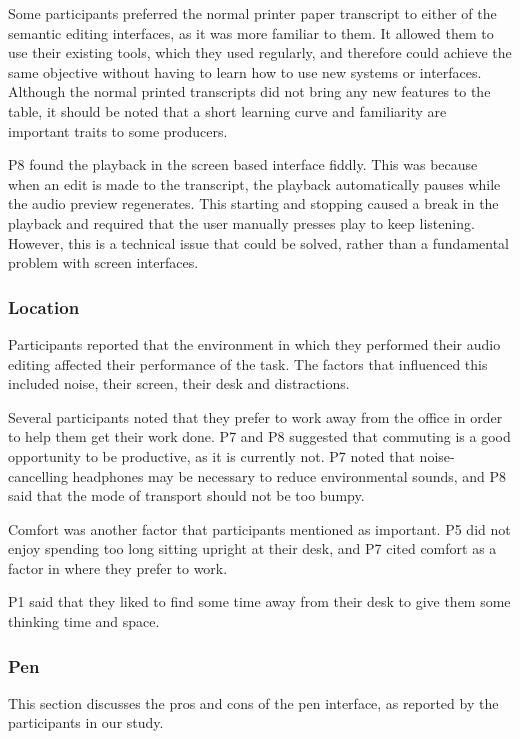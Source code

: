 Some participants preferred the normal printer paper transcript to either of the semantic editing interfaces, as it was
more familiar to them. It allowed them to use their existing tools, which they used regularly, and therefore could
achieve the same objective without having to learn how to use new systems or interfaces. Although the normal printed
transcripts did not bring any new features to the table, it should be noted that a short learning curve and familiarity
are important traits to some producers.

P8 found the playback in the screen based interface fiddly. This was because when an edit is made to the transcript,
the playback automatically pauses while the audio preview regenerates. This starting and stopping caused a break in the
playback and required that the user manually presses play to keep listening. However, this is a technical issue that
could be solved, rather than a fundamental problem with screen interfaces.

\subsubsection{Location}

Participants reported that the environment in which they performed their audio editing affected their performance of
the task. The factors that influenced this included noise, their screen, their desk and distractions.

Several participants noted that they prefer to work away from the office in order to help them get their work done. P7
and P8 suggested that commuting is a good opportunity to be productive, as it is currently not. P7 noted that
noise-cancelling headphones may be necessary to reduce environmental sounds, and P8 said that the mode of transport
should not be too bumpy.

Comfort was another factor that participants mentioned as important. P5 did not enjoy spending too long sitting upright
at their desk, and P7 cited comfort as a factor in where they prefer to work.

P1 said that they liked to find some time away from their desk to give them some thinking time and space.

\subsubsection{Pen}

This section discusses the pros and cons of the pen interface, as reported by the participants in our study.

